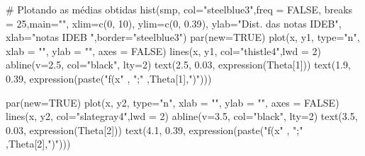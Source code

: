 \documentclass[
  letterpaper,
  DIV=11,
  numbers=noendperiod]{scrartcl}
\newenvironment{Shaded}{\begin{snugshade}}{\end{snugshade}}
\newcommand{\AttributeTok}[1]{\textcolor[rgb]{0.40,0.45,0.13}{#1}}
\newcommand{\CommentTok}[1]{\textcolor[rgb]{0.37,0.37,0.37}{#1}}
\newcommand{\ConstantTok}[1]{\textcolor[rgb]{0.56,0.35,0.01}{#1}}
\newcommand{\DecValTok}[1]{\textcolor[rgb]{0.68,0.00,0.00}{#1}}
\newcommand{\FloatTok}[1]{\textcolor[rgb]{0.68,0.00,0.00}{#1}}
\newcommand{\FunctionTok}[1]{\textcolor[rgb]{0.28,0.35,0.67}{#1}}
\newcommand{\NormalTok}[1]{\textcolor[rgb]{0.00,0.23,0.31}{#1}}
\newcommand{\StringTok}[1]{\textcolor[rgb]{0.13,0.47,0.30}{#1}}
\begin{document}
\begin{Shaded}
\begin{Highlighting}[]
\CommentTok{\# Plotando as médias obtidas}
\FunctionTok{hist}\NormalTok{(smp, }\AttributeTok{col=}\StringTok{"steelblue3"}\NormalTok{,}\AttributeTok{freq =} \ConstantTok{FALSE}\NormalTok{, }\AttributeTok{breaks =} \DecValTok{25}\NormalTok{,}\AttributeTok{main=}\StringTok{""}\NormalTok{,}
     \AttributeTok{xlim=}\FunctionTok{c}\NormalTok{(}\DecValTok{0}\NormalTok{, }\DecValTok{10}\NormalTok{), }\AttributeTok{ylim=}\FunctionTok{c}\NormalTok{(}\DecValTok{0}\NormalTok{, }\FloatTok{0.39}\NormalTok{), }\AttributeTok{ylab=}\StringTok{"Dist. das notas IDEB"}\NormalTok{, }
     \AttributeTok{xlab=}\StringTok{"notas IDEB "}\NormalTok{,}\AttributeTok{border=}\StringTok{"steelblue3"}\NormalTok{)}
\FunctionTok{par}\NormalTok{(}\AttributeTok{new=}\ConstantTok{TRUE}\NormalTok{)}
\FunctionTok{plot}\NormalTok{(x, y1, }\AttributeTok{type=}\StringTok{"n"}\NormalTok{, }\AttributeTok{xlab =} \StringTok{""}\NormalTok{, }\AttributeTok{ylab =} \StringTok{""}\NormalTok{, }\AttributeTok{axes =} \ConstantTok{FALSE}\NormalTok{)}
\FunctionTok{lines}\NormalTok{(x, y1, }\AttributeTok{col=}\StringTok{"thistle4"}\NormalTok{,}\AttributeTok{lwd =} \DecValTok{2}\NormalTok{)}
\FunctionTok{abline}\NormalTok{(}\AttributeTok{v=}\FloatTok{2.5}\NormalTok{, }\AttributeTok{col=}\StringTok{"black"}\NormalTok{, }\AttributeTok{lty=}\DecValTok{2}\NormalTok{)}
\FunctionTok{text}\NormalTok{(}\FloatTok{2.5}\NormalTok{, }\FloatTok{0.03}\NormalTok{, }\FunctionTok{expression}\NormalTok{(Theta[}\DecValTok{1}\NormalTok{]))}
\FunctionTok{text}\NormalTok{(}\FloatTok{1.9}\NormalTok{, }\FloatTok{0.39}\NormalTok{, }\FunctionTok{expression}\NormalTok{(}\FunctionTok{paste}\NormalTok{(}\StringTok{"f(x"}\NormalTok{ , }\StringTok{";"}\NormalTok{ ,Theta[}\DecValTok{1}\NormalTok{],}\StringTok{")"}\NormalTok{)))}

\FunctionTok{par}\NormalTok{(}\AttributeTok{new=}\ConstantTok{TRUE}\NormalTok{)}
\FunctionTok{plot}\NormalTok{(x, y2, }\AttributeTok{type=}\StringTok{"n"}\NormalTok{, }\AttributeTok{xlab =} \StringTok{""}\NormalTok{, }\AttributeTok{ylab =} \StringTok{""}\NormalTok{, }\AttributeTok{axes =} \ConstantTok{FALSE}\NormalTok{)}
\FunctionTok{lines}\NormalTok{(x, y2, }\AttributeTok{col=}\StringTok{"slategray4"}\NormalTok{,}\AttributeTok{lwd =} \DecValTok{2}\NormalTok{)}
\FunctionTok{abline}\NormalTok{(}\AttributeTok{v=}\FloatTok{3.5}\NormalTok{, }\AttributeTok{col=}\StringTok{"black"}\NormalTok{, }\AttributeTok{lty=}\DecValTok{2}\NormalTok{)}
\FunctionTok{text}\NormalTok{(}\FloatTok{3.5}\NormalTok{, }\FloatTok{0.03}\NormalTok{, }\FunctionTok{expression}\NormalTok{(Theta[}\DecValTok{2}\NormalTok{]))}
\FunctionTok{text}\NormalTok{(}\FloatTok{4.1}\NormalTok{, }\FloatTok{0.39}\NormalTok{, }\FunctionTok{expression}\NormalTok{(}\FunctionTok{paste}\NormalTok{(}\StringTok{"f(x"}\NormalTok{ , }\StringTok{";"}\NormalTok{ ,Theta[}\DecValTok{2}\NormalTok{],}\StringTok{")"}\NormalTok{)))}


\end{Highlighting}
\end{Shaded}
\end{document}
